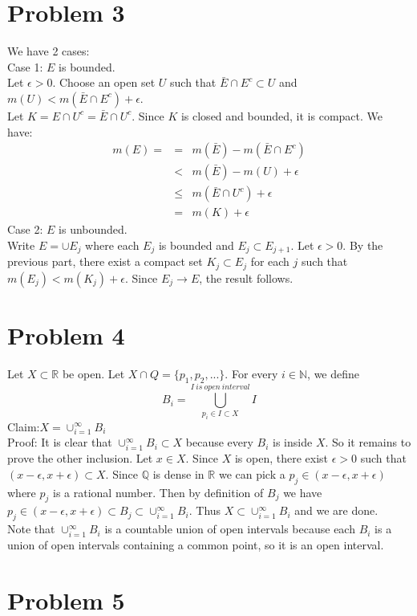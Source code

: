 \documentclass[12pt]{article}
\begin{document}
\clearpage
\section*{Problem 3}
We have 2 cases:\\
Case 1: $E$ is bounded. \\
Let $\epsilon >0$. Choose an open set $U$ such that $\bar{E} \cap E^c \subset U$ and $m(U) < m(\bar{E} \cap E^c)+\epsilon$. \\
Let $K=E \cap U^c = \bar{E} \cap U^c$. Since $K$ is closed and bounded, it is compact. We have:
\begin{eqnarray*}
m(E) = &=& m(\bar{E}) - m(\bar{E} \cap E^c)
\\ &<&
m(\bar{E})-m(U)+\epsilon
\\ &\le &
m(\bar{E} \cap U^c)+\epsilon
\\ &=&
m(K) + \epsilon
\end{eqnarray*}
Case 2: $E$ is unbounded. \\
Write $E=\cup E_j$ where each $E_j$ is bounded and $E_j \subset E_{j+1}$. Let $\epsilon > 0$. By the previous part, there exist a compact set $K_j \subset E_j$ for each $j$ such that $m(E_j) < m(K_j)+\epsilon$. Since $E_j \rightarrow E$, the result follows.
\section*{Problem 4}
Let $X \subset \mathbb{R}$ be open. Let $X \cap Q =\{p_1,p_2,...\}$.
For every $i \in \mathbb{N}$, we define
$$B_i = \bigcup_{p_i \in I \subset X}^{I  \ is  \ open \ interval} I$$
Claim:$X= \cup_{i=1}^{\infty} B_i$ \\
Proof: It is clear that $\cup_{i=1}^{\infty} B_i \subset X$ because every $B_i$ is inside $X$. So it remains to prove the other inclusion. 
Let $x \in X $. Since $X$ is open, there exist $\epsilon >0$ such that $(x-\epsilon,x+\epsilon) \subset X$. Since $\mathbb{Q}$ is dense in $\mathbb{R}$ we can pick a $p_j \in (x-\epsilon,x+\epsilon)$ where $p_j$ is a rational number. Then by definition of $B_j$ we have $p_j \in (x-\epsilon,x+\epsilon) \subset B_j \subset \cup_{i=1}^{\infty} B_i$. Thus $X \subset \cup_{i=1}^{\infty} B_i$ and we are done.\\
Note that $\cup_{i=1}^{\infty} B_i$ is a countable union of open intervals because each $B_i$ is a union of open intervals containing a common point, so it is an open interval.

\clearpage
\section*{Problem 5}
\end{document}
